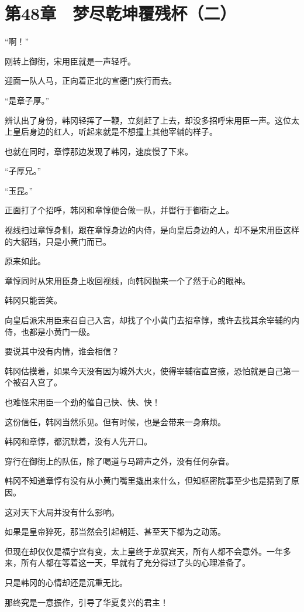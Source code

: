 \section{第48章　梦尽乾坤覆残杯（二）}

“啊！”

刚转上御街，宋用臣就是一声轻呼。

迎面一队人马，正向着正北的宣德门疾行而去。

“是章子厚。”

辨认出了身份，韩冈轻挥了一鞭，立刻赶了上去，却没多招呼宋用臣一声。这位太上皇后身边的红人，听起来就是不想撞上其他宰辅的样子。

也就在同时，章惇那边发现了韩冈，速度慢了下来。

“子厚兄。”

“玉昆。”

正面打了个招呼，韩冈和章惇便合做一队，并辔行于御街之上。

视线扫过章惇身侧，跟在章惇身边的内侍，是向皇后身边的人，却不是宋用臣这样的大貂珰，只是小黄门而已。

原来如此。

章惇同时从宋用臣身上收回视线，向韩冈抛来一个了然于心的眼神。

韩冈只能苦笑。

向皇后派宋用臣来召自己入宫，却找了个小黄门去招章惇，或许去找其余宰辅的内侍，也都是小黄门一级。

要说其中没有内情，谁会相信？

韩冈估摸着，如果今天没有因为城外大火，使得宰辅宿直宫掖，恐怕就是自己第一个被召入宫了。

也难怪宋用臣一个劲的催自己快、快、快！

这份信任，韩冈当然乐见。但有时候，也是会带来一身麻烦。

韩冈和章惇，都沉默着，没有人先开口。

穿行在御街上的队伍，除了喝道与马蹄声之外，没有任何杂音。

韩冈不知道章惇有没有从小黄门嘴里撬出来什么，但知枢密院事至少也是猜到了原因。

这对天下大局并没有什么影响。

如果是皇帝猝死，那当然会引起朝廷、甚至天下都为之动荡。

但现在却仅仅是福宁宫有变，太上皇终于龙驭宾天，所有人都不会意外。一年多来，所有人都在等着这一天，早就有了充分得过了头的心理准备了。

只是韩冈的心情却还是沉重无比。

那终究是一意振作，引导了华夏复兴的君主！

